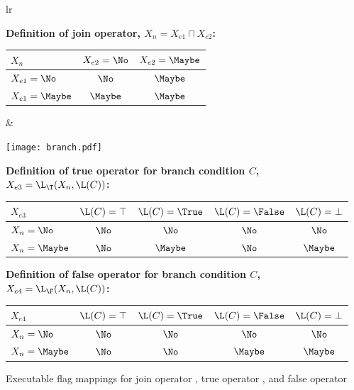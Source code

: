 \begin{figure}%
\begin{tabular}{lr}
\begin{minipage}{3.75in}
{\bf Definition of join operator, $X_n = X_{e1} \sqcap X_{e2}$:}

\medskip

\begin{tabular}{|l||c|c|}
\hline
$X_n$ & $X_{e2} = \No$ & $X_{e2} = \Maybe$  \\
\hline \hline 
$X_{e1} = \No$ & $\No$ & $\Maybe$  \\
\hline
$X_{e1} = \Maybe$ & $\Maybe$ & $\Maybe$  \\
\hline
\end{tabular}
\end{minipage}
&
\begin{minipage}{1.0in}
\texttt{[image: branch.pdf]}
\end{minipage}
\end{tabular}

\bigskip
\bigskip

{\bf Definition of true operator for branch condition $C$,\\
$X_{e3} = \L_{\T}(X_n,\L(C))$:}

\medskip

\begin{tabular}{|l||c|c|c|c|}
\hline
$X_{e3}$ & $\L(C) = \top$ & $\L(C) = \True$ & $\L(C) = \False$ & $\L(C) = \bot$ \\
\hline \hline
$X_n = \No$ & $\No$ & $\No$ & $\No$ & $\No$ \\
\hline
$X_n = \Maybe $ & $\No$ & $\Maybe$ & $\No$ & $\Maybe$ \\
\hline
\end{tabular}

\bigskip
\bigskip

{\bf
Definition of false operator for branch condition $C$,\\
$X_{e4} = \L_{\F}(X_n, \L(C))$:}

\medskip

\begin{tabular}{|l||c|c|c|c|}
\hline
 $X_{e4}$ & $\L(C) = \top$ & $\L(C) = \True$ & $\L(C) = \False$ & $\L(C) = \bot$ \\
\hline \hline
$X_n = \No$ & $\No$ & $\No$ & $\No$ & $\No$ \\
\hline
$X_n = \Maybe$ & $\No$ & $\No$ & $\Maybe$ & $\Maybe$ \\
\hline
\end{tabular}
\caption{Executable flag mappings for join operator \protect{$(\sqcap)$},
true operator \protect{$(\L_{\T})$}, and false operator \protect{$(\L_{\F})$}}
\label{fig:mappings}
\end{figure}

